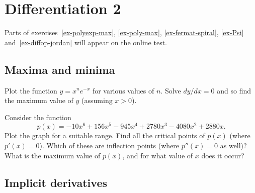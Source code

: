 \documentclass[a4paper,10pt]{amsbook}
\numberwithin{example}{chapter}
\begin{document}
\chapter{Differentiation 2}


Parts of exercises~\ref{ex-polyexp-max}, \ref{ex-poly-max},
\ref{ex-fermat-spiral}, \ref{ex-Psi}
and~\ref{ex-diffop-jordan} will appear on the online test.

\section{Maxima and minima}

\begin{exercise}\label{ex-polyexp-max}
 Plot the function $y=x^ne^{-x}$ for various values of $n$.
 Solve $dy/dx=0$ and so find the maximum value of $y$
 (assuming $x>0$).
\end{exercise}

\begin{exercise}\label{ex-poly-max}
 Consider the function
 \[ p(x) = -10x^6+156x^5-945x^4+2780x^3-4080x^2+2880x. \]
 Plot the graph for a suitable range.  Find all the critical
 points of $p(x)$ (where $p'(x)=0$).  Which of these are
 inflection points (where $p''(x)=0$ as well)?  What is the
 maximum value of $p(x)$, and for what value of $x$ does it
 occur? 
\end{exercise}

\section{Implicit derivatives}
\end{document}
